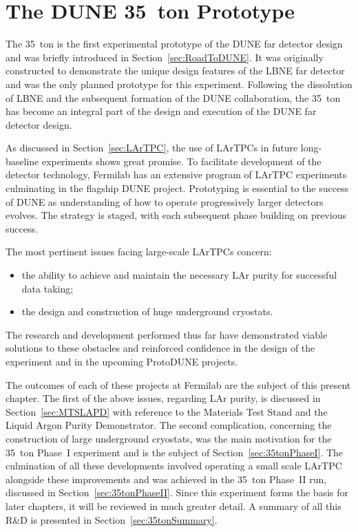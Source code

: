 
\graphicspath{{35ton/Figs/}}

\chapter{The DUNE 35~ton Prototype}\label{chap:35ton}

The 35~ton is the first experimental prototype of the DUNE far detector design and was briefly introduced in Section~\ref{sec:RoadToDUNE}.  It was originally constructed to demonstrate the unique design features of the LBNE far detector and was the only planned prototype for this experiment.  Following the dissolution of LBNE and the subsequent formation of the DUNE collaboration, the 35~ton has become an integral part of the design and execution of the DUNE far detector design.

As discussed in Section~\ref{sec:LArTPC}, the use of LArTPCs in future long-baseline experiments shows great promise.  To facilitate development of the detector technology, Fermilab has an extensive program of LArTPC experiments culminating in the flagship DUNE project.  Prototyping is essential to the success of DUNE as understanding of how to operate progressively larger detectors evolves.  The strategy is staged, with each subsequent phase building on previous success.

The most pertinent issues facing large-scale LArTPCs concern:
\begin{itemize}
  \item the ability to achieve and maintain the necessary LAr purity for successful data taking;
  \item the design and construction of huge underground cryostats.
\end{itemize}
The research and development performed thus far have demonstrated viable solutions to these obstacles and reinforced confidence in the design of the experiment and in the upcoming ProtoDUNE projects.

The outcomes of each of these projects at Fermilab are the subject of this present chapter.  The first of the above issues, regarding LAr purity, is discussed in Section~\ref{sec:MTSLAPD} with reference to the Materials Test Stand and the Liquid Argon Purity Demonstrator.  The second complication, concerning the construction of large underground cryostats, was the main motivation for the 35~ton Phase~I experiment and is the subject of Section~\ref{sec:35tonPhaseI}.  The culmination of all these developments involved operating a small scale LArTPC alongside these improvements and was achieved in the 35~ton Phase~II run, discussed in Section~\ref{sec:35tonPhaseII}.  Since this experiment forms the basis for later chapters, it will be reviewed in much greater detail.  A summary of all this R\&D is presented in Section~\ref{sec:35tonSummary}.

